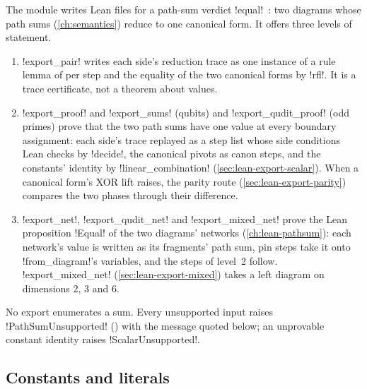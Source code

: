 {{{The module  writes Lean files for a path-sum
verdict \azx!equal!~\cite{amy2018pathsums}: two diagrams whose path sums
(\cref{ch:semantics}) reduce to one canonical form. It offers three levels of statement.
\begin{enumerate}
\item \lexpy!export_pair! writes each side's reduction trace as one instance of a rule lemma of
 per step and the equality of the two canonical forms by
\lexlean!rfl!. It is a trace certificate, not a theorem about values.
\item \lexpy!export_proof! and \lexpy!export_sums! (qubits) and \lexpy!export_qudit_proof! (odd primes)
prove that the two path sums have one value at every boundary assignment: each side's trace
replayed as a step list whose side conditions Lean checks by \lexlean!decide!, the canonical
pivots as canon steps, and the constants' identity by \lexlean!linear_combination!
(\cref{sec:lean-export-scalar}). When a canonical form's XOR lift raises, the parity route
(\cref{sec:lean-export-parity}) compares the two phases through their difference.
\item \lexpy!export_net!, \lexpy!export_qudit_net! and \lexpy!export_mixed_net! prove the Lean
proposition \lexlean!Equal! of the two diagrams' networks (\cref{ch:lean-pathsum}): each
network's value is written as its fragments' path sum, pin steps take it onto
\lexpy!from_diagram!'s variables, and the steps of level~2 follow. \lexpy!export_mixed_net!
(\cref{sec:lean-export-mixed}) takes a left diagram on dimensions 2, 3 and 6.
\end{enumerate}
No export enumerates a sum. Every unsupported input raises
\lexpy!PathSumUnsupported! () with the message quoted below;
an unprovable constant identity raises \lexpy!ScalarUnsupported!.

\subsection{Constants and literals}

}}}

